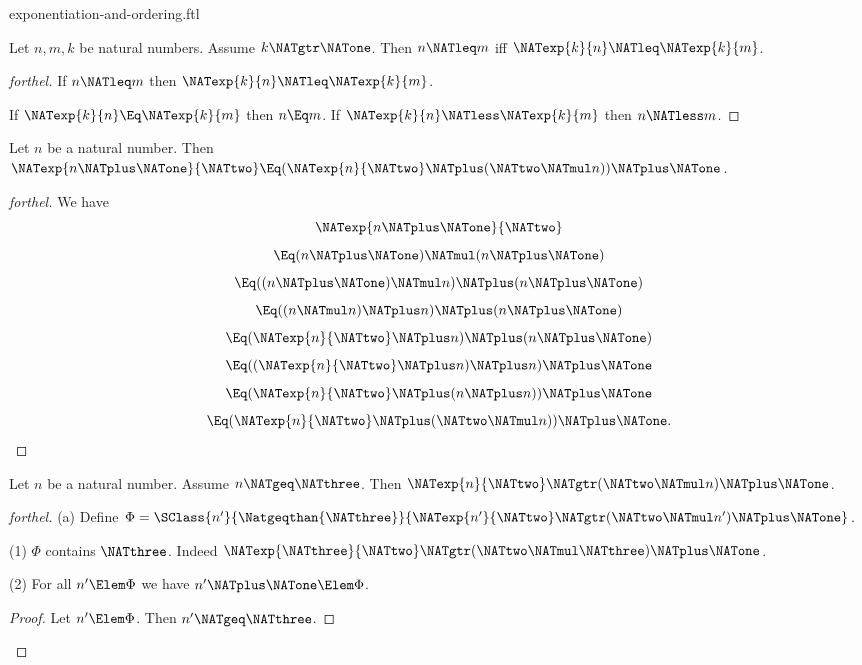 \documentclass{stex}
\begin{document}
\begin{smodule}{exponentiation-and-ordering.ftl}
\begin{corollary}[forthel]
  Let $n, m, k$ be natural numbers.
  Assume $k \NATgtr \NATone$.
  Then $n \NATleq m$ iff $\NATexp{k}{n} \NATleq \NATexp{k}{m}$.
\end{corollary}
\begin{proof}[forthel]
  If $n \NATleq m$ then $\NATexp{k}{n} \NATleq \NATexp{k}{m}$.

  If $\NATexp{k}{n} \Eq \NATexp{k}{m}$ then $n \Eq m$.
  If $\NATexp{k}{n} \NATless \NATexp{k}{m}$ then $n \NATless m$.
\end{proof}

\begin{proposition}[forthel]
  Let $n$ be a natural number.
  Then $\NATexp{n \NATplus \NATone}{\NATtwo} \Eq (\NATexp{n}{\NATtwo} \NATplus (\NATtwo \NATmul n)) \NATplus \NATone$.
\end{proposition}
\begin{proof}[forthel]
  We have
  \[  \NATexp{n \NATplus \NATone}{\NATtwo}                       \]
  \[    \Eq (n \NATplus \NATone) \NATmul (n \NATplus \NATone)         \]
  \[    \Eq ((n \NATplus \NATone) \NATmul n) \NATplus (n \NATplus \NATone)   \]
  \[    \Eq ((n \NATmul n) \NATplus n) \NATplus (n \NATplus \NATone)   \]
  \[    \Eq (\NATexp{n}{\NATtwo} \NATplus n) \NATplus (n \NATplus \NATone)         \]
  \[    \Eq ((\NATexp{n}{\NATtwo} \NATplus n) \NATplus n) \NATplus \NATone         \]
  \[    \Eq (\NATexp{n}{\NATtwo} \NATplus (n \NATplus n)) \NATplus \NATone         \]
  \[    \Eq (\NATexp{n}{\NATtwo} \NATplus (\NATtwo \NATmul n)) \NATplus \NATone.    \]
\end{proof}

\begin{proposition}[forthel]
  Let $n$ be a natural number.
  Assume $n \NATgeq \NATthree$.
  Then $\NATexp{n}{\NATtwo} \NATgtr (\NATtwo \NATmul n) \NATplus \NATone$.
\end{proposition}
\begin{proof}[forthel]
  (a) Define $\Phi = \SClass{n'}{\Natgeqthan{\NATthree}}{\NATexp{n'}{\NATtwo} \NATgtr (\NATtwo \NATmul n') \NATplus \NATone}$.

  (1) $\Phi$ contains $\NATthree$.
  Indeed $\NATexp{\NATthree}{\NATtwo} \NATgtr (\NATtwo \NATmul \NATthree) \NATplus \NATone$.

  (2) For all $n' \Elem \Phi$ we have $n' \NATplus \NATone \Elem \Phi$.
  \begin{proof}
    Let $n' \Elem \Phi$.
    Then $n' \NATgeq \NATthree$.


\end{proof}
\end{proof}
\end{smodule}
\end{document}
